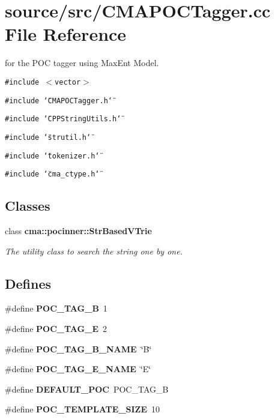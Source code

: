 \section{source/src/CMAPOCTagger.cc File Reference}
\label{CMAPOCTagger_8cc}
for the POC tagger using MaxEnt Model.  


{\tt \#include $<$vector$>$}\par
{\tt \#include \char`\"{}CMAPOCTagger.h\char`\"{}}\par
{\tt \#include \char`\"{}CPPStringUtils.h\char`\"{}}\par
{\tt \#include \char`\"{}strutil.h\char`\"{}}\par
{\tt \#include \char`\"{}tokenizer.h\char`\"{}}\par
{\tt \#include \char`\"{}cma\_\-ctype.h\char`\"{}}\par
\subsection*{Classes}
\begin{CompactItemize}
\item 
class {\bf cma::pocinner::StrBasedVTrie}
\begin{CompactList}\small\item\em The utility class to search the string one by one. \item\end{CompactList}\end{CompactItemize}
\subsection*{Defines}
\begin{CompactItemize}
\item 
\#define \textbf{POC\_\-TAG\_\-B}~1\label{CMAPOCTagger_8cc_357022548e14d085e3c93f3906bcccd9}

\item 
\#define \textbf{POC\_\-TAG\_\-E}~2\label{CMAPOCTagger_8cc_9bdb1f3b570b2741da85e468e4d9f6c9}

\item 
\#define \textbf{POC\_\-TAG\_\-B\_\-NAME}~\char`\"{}B\char`\"{}\label{CMAPOCTagger_8cc_d335e18aeb001bbc74ae9991723398d9}

\item 
\#define \textbf{POC\_\-TAG\_\-E\_\-NAME}~\char`\"{}E\char`\"{}\label{CMAPOCTagger_8cc_a88cc556dbff3f12beefe55268610c91}

\item 
\#define \textbf{DEFAULT\_\-POC}~POC\_\-TAG\_\-B\label{CMAPOCTagger_8cc_491f74f500e8d8fba02698dc4035719c}

\item 
\#define \textbf{POC\_\-TEMPLATE\_\-SIZE}~10\label{CMAPOCTagger_8cc_3685a42953194139b2746ed970c98059}

\end{CompactItemize}
